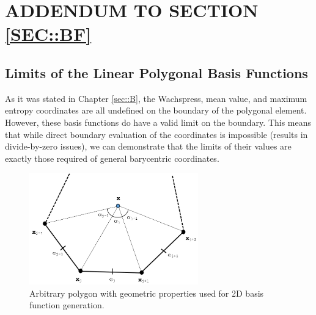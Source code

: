 %
%
%

\chapter{\uppercase{Addendum to Section \ref{sec::BF}}}
\label{sec::appendix_BF}

\section{Limits of the Linear Polygonal Basis Functions}
\label{sec::appendix_BF_Limits}

As it was stated in Chapter \ref{sec::B}, the Wachspress, mean value, and maximum entropy coordinates are all undefined on the boundary of the polygonal element. However, these basis functions do have a valid limit on the boundary. This means that while direct boundary evaluation of the coordinates is impossible (results in divide-by-zero issues), we can demonstrate that the limits of their values are exactly those required of general barycentric coordinates.

\begin{figure}
\centering
\includegraphics[width=0.65\textwidth]{figures/appendices/ref_polygon.png}
\caption{Arbitrary polygon with geometric properties used for 2D basis function generation.}
\label{fig::App_BF_2D_ref_polygon}
\end{figure}


